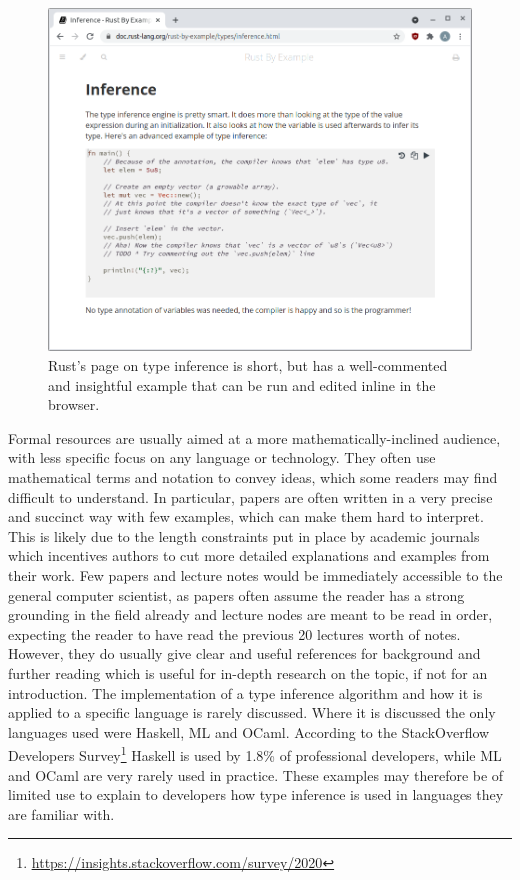 \documentclass[a4paper,fleqn,oneside,12pt]{report}
\begin{document}
\begin{figure}[h!]
  \centering
  \includegraphics[width=1.000\linewidth]{images/image24.png}
  \caption{Rust's page on type inference is short, but has a well-commented and insightful example that can be run and edited inline in the browser.}
\end{figure}

Formal resources are usually aimed at a more mathematically-inclined audience, with less specific focus on any language or technology. They often use mathematical terms and notation to convey ideas, which some readers may find difficult to understand. In particular, papers are often written in a very precise and succinct way with few examples, which can make them hard to interpret. This is likely due to the length constraints put in place by academic journals which incentives authors to cut more detailed explanations and examples from their work. Few papers and lecture notes would be immediately accessible to the general computer scientist, as papers often assume the reader has a strong grounding in the field already and lecture nodes are meant to be read in order, expecting the reader to have read the previous 20 lectures worth of notes. However, they do usually give clear and useful references for background and further reading which is useful for in-depth research on the topic, if not for an introduction. The implementation of a type inference algorithm and how it is applied to a specific language is rarely discussed. Where it is discussed the only languages used were Haskell, ML and OCaml. According to the StackOverflow Developers Survey\footnote{\underline{\href{https://insights.stackoverflow.com/survey/2020\#technology-programming-scripting-and-markup-languages}{https://insights.stackoverflow.com/survey/2020}}} Haskell is used by 1.8\% of professional developers, while ML and OCaml are very rarely used in practice. These examples may therefore be of limited use to explain to developers how type inference is used in languages they are familiar with.
\end{document}
